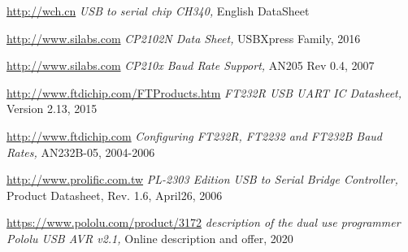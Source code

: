 \documentclass[pdftex,12pt,a4paper,oneside,english]{report}
\begin{document}
\begin{thebibliography}{99}
\url{http://wch.cn}
\emph{USB to serial chip CH340,}
English DataSheet

\url{http://www.silabs.com}
\emph{CP2102N Data Sheet,}
USBXpress Family,
2016

\url{http://www.silabs.com}
\emph{CP210x Baud Rate Support,}
AN205 Rev 0.4,
2007

\url{http://www.ftdichip.com/FTProducts.htm}
\emph{FT232R USB UART IC Datasheet,}
Version 2.13,
2015

\url{http://www.ftdichip.com}
\emph{Configuring FT232R, FT2232 and FT232B Baud Rates,}
AN232B-05,
2004-2006

\url{http://www.prolific.com.tw}
\emph{PL-2303 Edition USB to Serial Bridge Controller,}
Product Datasheet, Rev. 1.6,
April26, 2006

\url{https://www.pololu.com/product/3172}
\emph{description of the dual use programmer Pololu USB AVR v2.1,}
Online description and offer,
2020
\end{thebibliography}
\end{document}

